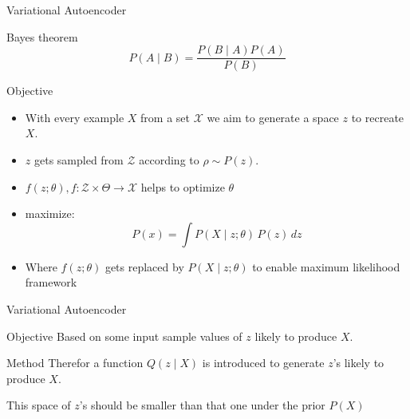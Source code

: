 \documentclass{beamer}
\begin{document}
\begin{frame}{Variational Autoencoder}
    \begin{block}{Bayes theorem}
        \begin{equation}
            P(A\mid B) = \frac{P(B \mid A) P(A)}{P(B)}
        \end{equation}
    \end{block}

    \begin{block}{Objective}
        \begin{itemize}
            \item With every example $X$ from a set $\mathcal{X}$ we aim to generate a space $z$ to
                recreate $X$.
            \item $z$ gets sampled from $\mathcal{Z}$ according to $\rho \sim P(z)$.
            \item $f(z;\theta), f: \mathcal{Z} \times \Theta \to \mathcal{X}$ helps to optimize 
                $\theta$ 
            \item maximize:
                \begin{equation}
                    P(x) = \int P(X\mid z; \theta)\, P(z) \, dz
                \end{equation}
            \item Where $f(z;\theta)$ gets replaced by $P(X\mid z; \theta)$ to enable maximum 
                likelihood framework
        \end{itemize}
    \end{block}
\end{frame}


\begin{frame}{Variational Autoencoder}
    \begin{block}{Objective}
        Based on some input sample values of $z$ likely to produce $X$.
    \end{block}
    \begin{block}{Method}
        Therefor a function $Q(z\mid X)$ is introduced to generate $z$'s likely to produce $X$.

        This space of $z$'s should be smaller than that one under the prior $P(X)$
    \end{block}
\end{frame}
\end{document}
